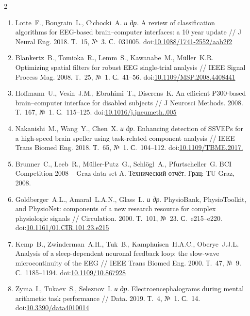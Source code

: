 \documentclass[14pt,a4paper]{extarticle}
\begin{document}
\begin{multicols}{2}
\begin{otherlanguage}{russian}
\begin{enumerate}[leftmargin=*,label={\arabic*.},itemsep=3pt,topsep=4pt]
\item Lotte~F., Bougrain~L., Cichocki~A. \textit{и др.}
A review of classification algorithms for EEG-based brain--computer interfaces: a 10 year update
// J Neural Eng. 2018. Т.~15, №~3. С.~031005.
doi:\href{https://doi.org/10.1088/1741-2552/aab2f2}{10.1088/1741-2552/aab2f2}

\item Blankertz~B., Tomioka~R., Lemm~S., Kawanabe~M., M\"{u}ller~K.R.
Optimizing spatial filters for robust EEG single-trial analysis
// IEEE Signal Process Mag. 2008. Т.~25, №~1. С.~41--56.
doi:\href{https://doi.org/10.1109/MSP.2008.4408441}{10.1109/MSP.2008.4408441}

\item Hoffmann~U., Vesin~J.M., Ebrahimi~T., Diserens~K.
An efficient P300-based brain--computer interface for disabled subjects
// J Neurosci Methods. 2008. Т.~167, №~1. С.~115--125.
doi:\href{https://doi.org/10.1016/j.jneumeth.2007.03.005}{10.1016/\allowbreak j.jneumeth..005}

\item Nakanishi~M., Wang~Y., Chen~X. \textit{и др.}
Enhancing detection of SSVEPs for a high-speed brain speller using task-related component analysis
// IEEE Trans Biomed Eng. 2018. Т.~65, №~1. С.~104--112.
doi:\href{https://doi.org/10.1109/TBME.2017.2694818}{10.1109/\allowbreak TBME.2017.}

\item Brunner~C., Leeb~R., M\"{u}ller-Putz~G., Schl\"{o}gl~A., Pfurtscheller~G.
BCI Competition 2008 -- Graz data set A.
Технический отчёт. Грац: TU Graz, 2008.

\item Goldberger~A.L., Amaral~L.A.N., Glass~L. \textit{и др.}
PhysioBank, PhysioToolkit, and PhysioNet: components of a new research resource for complex physiologic signals
// Circulation. 2000. Т.~101, №~23. С.~e215--e220.
doi:\href{https://doi.org/10.1161/01.CIR.101.23.e215}{10.1161/01.CIR.101.23.e215}

\item Kemp~B., Zwinderman~A.H., Tuk~B., Kamphuisen~H.A.C., Oberye~J.J.L.
Analysis of a sleep-dependent neuronal feedback loop: the slow-wave microcontinuity of the EEG
// IEEE Trans Biomed Eng. 2000. Т.~47, №~9. С.~1185--1194.
doi:\href{https://doi.org/10.1109/10.867928}{10.1109/10.867928}

\item Zyma~I., Tukaev~S., Seleznov~I. \textit{и др.}
Electroencephalograms during mental arithmetic task performance
// Data. 2019. Т.~4, №~1. С.~14.
doi:\href{https://doi.org/10.3390/data4010014}{10.3390/data4010014}


\end{enumerate}
\end{otherlanguage}
\end{multicols}
\end{document}
